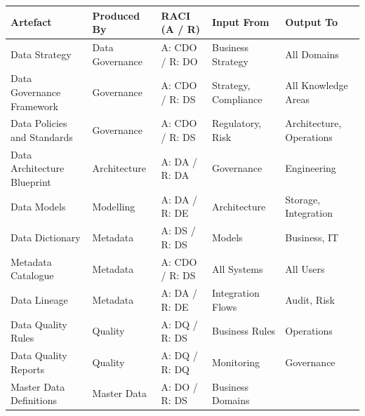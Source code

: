 \documentclass[
  letterpaper,
  DIV=11,
  numbers=noendperiod]{scrartcl}
\begin{document}
\begin{longtable}[]{@{}
  >{\raggedright\arraybackslash}p{}
  >{\raggedright\arraybackslash}p{}
  >{\raggedright\arraybackslash}p{}
  >{\raggedright\arraybackslash}p{}
  >{\raggedright\arraybackslash}p{}@{}}
\toprule\noalign{}
\begin{minipage}[b]{\linewidth}\raggedright
Artefact
\end{minipage} & \begin{minipage}[b]{\linewidth}\raggedright
Produced By
\end{minipage} & \begin{minipage}[b]{\linewidth}\raggedright
RACI (A / R)
\end{minipage} & \begin{minipage}[b]{\linewidth}\raggedright
Input From
\end{minipage} & \begin{minipage}[b]{\linewidth}\raggedright
Output To
\end{minipage} \\
\midrule\noalign{}
\endhead
\bottomrule\noalign{}
\endlastfoot
Data Strategy & Data Governance & A: CDO / R: DO & Business Strategy &
All Domains \\
Data Governance Framework & Governance & A: CDO / R: DS & Strategy,
Compliance & All Knowledge Areas \\
Data Policies and Standards & Governance & A: CDO / R: DS & Regulatory,
Risk & Architecture, Operations \\
Data Architecture Blueprint & Architecture & A: DA / R: DA & Governance
& Engineering \\
Data Models & Modelling & A: DA / R: DE & Architecture & Storage,
Integration \\
Data Dictionary & Metadata & A: DS / R: DS & Models & Business, IT \\
Metadata Catalogue & Metadata & A: CDO / R: DS & All Systems & All
Users \\
Data Lineage & Metadata & A: DA / R: DE & Integration Flows & Audit,
Risk \\
Data Quality Rules & Quality & A: DQ / R: DS & Business Rules &
Operations \\
Data Quality Reports & Quality & A: DQ / R: DQ & Monitoring &
Governance \\
Master Data Definitions & Master Data & A: DO / R: DS & Business Domains

\end{longtable}
\end{document}
